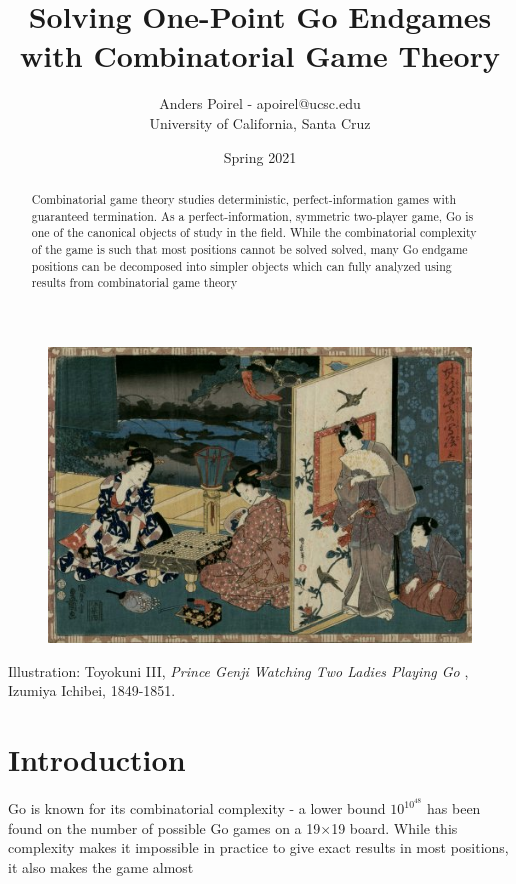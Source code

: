 \documentclass{article}
\title{Solving One-Point Go Endgames with Combinatorial Game Theory}
\author{Anders Poirel - apoirel@ucsc.edu \\ University of California, Santa Cruz}
\date{Spring 2021}
\theoremstyle{plain}
\theoremstyle{definition}
\begin{document}
\maketitle

\begin{figure}[ht]
    \centering
    \includegraphics[width=\textwidth]{prince_genji.jpg}
\end{figure}

\begin{abstract}
    Combinatorial game theory studies deterministic, perfect-information 
    games with guaranteed termination. As a perfect-information, symmetric 
    two-player game, Go is one of the canonical objects of study in the field.
    While the combinatorial complexity of the game is such that most positions cannot 
    be solved solved, 
    many Go endgame positions can be decomposed into simpler objects which can fully
    analyzed using results from combinatorial game theory
\end{abstract}

\newpage

Illustration: Toyokuni III, \textit{Prince Genji Watching Two Ladies Playing Go }, 
Izumiya Ichibei, 1849-1851.

\tableofcontents
\newpage 
\section{Introduction}

Go is known for its combinatorial complexity - a lower bound $10^{10^48}$ has 
been found on the number of possible Go games on a 19$\times$19 board. While this complexity 
makes it impossible in practice to give exact results in most positions, it also makes 
the game almost 
\end{document}
